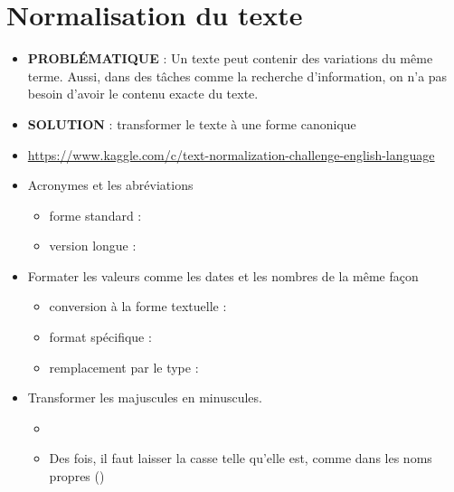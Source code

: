 \documentclass{KodeBook}
\begin{document}
\section{Normalisation du texte}

\begin{itemize}
	\item \textbf{PROBLÉMATIQUE} : Un texte peut contenir des variations du même terme. Aussi, dans des tâches comme la recherche d'information, on n'a pas besoin d'avoir le contenu exacte du texte.
	\item \textbf{SOLUTION} : transformer le texte à une forme canonique 
	\item \url{https://www.kaggle.com/c/text-normalization-challenge-english-language}
\end{itemize}

\begin{itemize}
	
	\item Acronymes et les abréviations 
	\begin{itemize}
		\item forme standard : 
		\item version longue : 
	\end{itemize}
	
	\item Formater les valeurs comme les dates et les nombres de la même façon
	\begin{itemize}
		\item conversion à la forme textuelle : 
		\item format spécifique : 
		\item remplacement par le type : 
	\end{itemize}
	
	\item Transformer les majuscules en minuscules. 
	\begin{itemize}
		\item {}
		\item Des fois, il faut laisser la casse telle qu'elle est, comme dans les noms propres ()
	\end{itemize}
\end{itemize}
\end{document}
